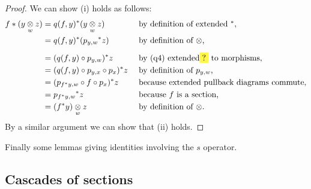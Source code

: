 \begin{proof}
We can show (i) holds as follows:
\begin{align*}
f * (\yz) &= q(f,y)^*(\yz)            &&\mbox{ by definition of extended $^*$},                \\
          &= q(f,y)^*({p_{y,w}} ^* z) &&\mbox{ by definition of $\crossx{}{}{}$,}              \\
          &= (q(f,y)\circ p_{y,w}) ^* z             &&\mbox{ by (q4)  extended\highlight{?} to morphisms,}                         \\
          &= (q(f,y) \circ p_{y,x} \circ p_x ) ^* z &&\mbox{ by definition of $p_{y,w}$,}      \\
          &= (p_{f^*y,w} \circ f \circ p_x ) ^* z   &&\mbox{ because extended pullback diagrams commute,} \\
          &= {p_{f^*y,w}}^*z                        &&\mbox{ because $f$ is a section,}                   \\
          &= \crossx{(f^*y)}{z}{w}                  &&\mbox{ by definition of $\crossx{}{}{}$.}
\end{align*}
By a similar argument we can show that (ii) holds.
\end{proof}

Finally some lemmas giving identities involving the $s$ operator.





\subsection{Cascades of sections}
